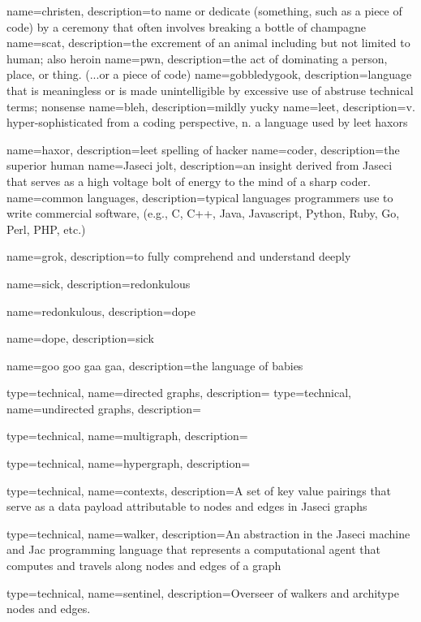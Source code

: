 {
    name=christen,
    description={to name or dedicate (something, such as a piece of code) by a ceremony that often involves breaking a bottle of champagne}
}
{
    name=scat,
    description={the excrement of an animal including but not limited to human; also heroin }
}
{
    name=pwn,
    description={the act of dominating a person, place, or thing. (...or a piece of code)}
}
{
    name=gobbledygook,
    description={language that is meaningless or is made unintelligible by excessive use of abstruse technical terms; nonsense}
}
{
    name=bleh,
    description={mildly yucky}
}
{
    name=leet,
    description={v. hyper-sophisticated from a coding perspective, n. a language used by \gls{leet} \gls{haxor}s}
}

{
    name=haxor,
    description={\gls{leet} spelling of hacker}
}
{
    name=coder,
    description={the superior human}
}
{
    name=Jaseci jolt,
    description={an insight derived from Jaseci that serves as a high voltage bolt of energy to the mind of a sharp coder.}
}
{
    name=common languages,
    description={typical languages programmers use to write commercial software, (e.g., C, C++, Java, Javascript, Python, Ruby, Go, Perl, PHP, etc.)}
}

{
    name=grok,
    description={to fully comprehend and understand deeply }
}

{
    name=sick,
    description={\gls{redonkulous}}
}

{
    name=redonkulous,
    description={\gls{dope}}
}

{
    name=dope,
    description={\gls{sick}}
}

{
    name=goo goo gaa gaa,
    description={the language of babies}
}

{
    type=technical,
    name=directed graphs,
    description={}
}
{
    type=technical,
    name=undirected graphs,
    description={}
}

{
    type=technical,
    name=multigraph,
    description={}
}

{
    type=technical,
    name=hypergraph,
    description={}
}

{
    type=technical,
    name=contexts,
    description={A set of key value pairings that serve as a data payload attributable to nodes and edges in Jaseci graphs}
}

{
    type=technical,
    name=walker,
    description={An abstraction in the Jaseci machine and Jac programming language that represents a computational agent that computes and travels along nodes and edges of a graph}
}

{
    type=technical,
    name=sentinel,
    description={Overseer of walkers and architype nodes and edges.}
}
